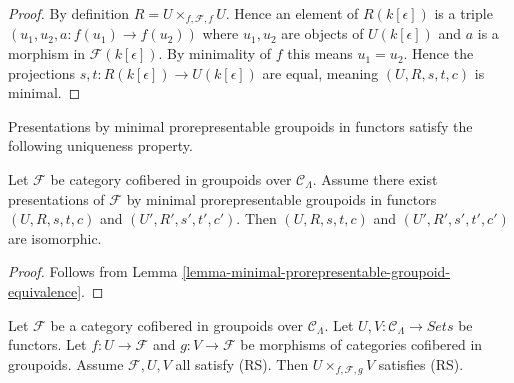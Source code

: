 \begin{proof}
By definition $R = U \times_{f,\mathcal{F}, f} U$.  Hence an element of 
$R(k[\epsilon])$ is a triple $(u_1, u_2, a: f(u_1) \to f(u_2))$ 
where $u_1,u_2$ are objects of $U(k[\epsilon])$ and $a$ is a morphism in 
$\mathcal{F}(k[\epsilon])$.  By minimality of $f$ this means $u_1 = u_2$.  
Hence the projections $s,t: R(k[\epsilon]) \to U(k[\epsilon])$ 
are equal, meaning  $(U,R,s,t,c)$ is minimal.
\end{proof}

\noindent
Presentations by minimal prorepresentable groupoids in functors satisfy the 
following uniqueness property.

\begin{lemma}
\label{lemma-minimal-presentations-equivalent}
Let $\mathcal{F}$ be category cofibered in groupoids over $\mathcal 
C_\Lambda$. Assume there exist presentations of $\mathcal{F}$ by minimal 
prorepresentable groupoids in functors $(U,R,s,t,c)$ and $(U',R',s',t',c')$. 
Then $(U,R,s,t,c)$ and $(U',R',s',t',c')$ are isomorphic.
\end{lemma}

\begin{proof}
Follows from Lemma \ref{lemma-minimal-prorepresentable-groupoid-equivalence}.
\end{proof}

\begin{lemma}
\label{lemma-RS-fiber-product-morphisms}
Let $\mathcal{F}$ be a category cofibered in groupoids over $\mathcal 
C_\Lambda$.  Let $U,V: \mathcal{C}_\Lambda \to \textit{Sets}$ 
be functors.  Let $f: U \to \mathcal{F}$ and $g: V \to \mathcal 
F$ be morphisms of categories cofibered in groupoids.  Assume $\mathcal{F}, U, 
V$ all satisfy (RS).  Then $U \times_{f, \mathcal{F}, g} V$ satisfies (RS).
\end{lemma}

